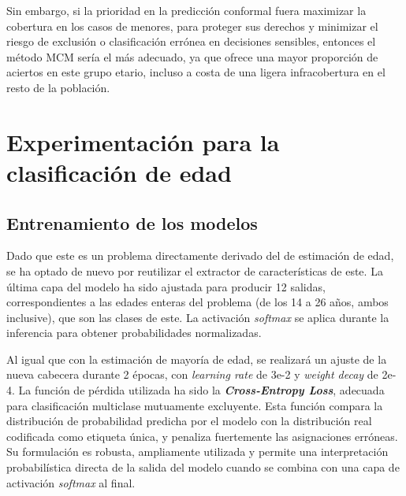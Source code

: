 Sin embargo, si la prioridad en la predicción conformal fuera maximizar la cobertura en los casos de menores, para proteger sus derechos y minimizar el riesgo de exclusión o clasificación errónea en decisiones sensibles, entonces el método MCM sería el más adecuado, ya que ofrece una mayor proporción de aciertos en este grupo etario, incluso a costa de una ligera infracobertura en el resto de la población.


\FloatBarrier



\section{Experimentación para la clasificación de edad}


\subsection{Entrenamiento de los modelos}

Dado que este es un problema directamente derivado del de estimación de edad, se ha optado de nuevo por reutilizar el extractor de características de este. La última capa del modelo ha sido ajustada para producir 12 salidas, correspondientes a las edades enteras del problema (de los 14 a 26 años, ambos inclusive), que son las clases de este. La activación \textit{softmax} se aplica durante la inferencia para obtener probabilidades normalizadas.

Al igual que con la estimación de mayoría de edad, se realizará un ajuste de la nueva cabecera durante 2 épocas, con \textit{learning rate} de 3e-2 y \textit{weight decay} de 2e-4. La función de pérdida utilizada ha sido la \textbf{\textit{Cross-Entropy Loss}}, adecuada para clasificación multiclase mutuamente excluyente. Esta función compara la distribución de probabilidad predicha por el modelo con la distribución real codificada como etiqueta única, y penaliza fuertemente las asignaciones erróneas. Su formulación es robusta, ampliamente utilizada y permite una interpretación probabilística directa de la salida del modelo cuando se combina con una capa de activación \textit{softmax} al final.

